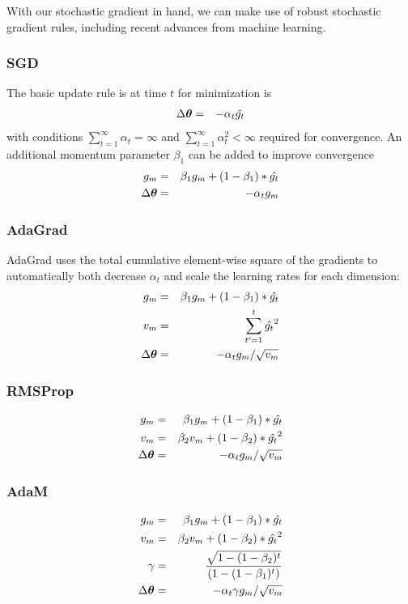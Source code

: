 \documentclass[]{article}
\begin{document}
With our stochastic gradient in hand, we can make use of robust stochastic gradient rules, including recent advances from machine learning.

\subsubsection{SGD}
The basic update rule is at time $t$ for minimization is
\begin{eqnarray}
  \Delta{\bm \theta} & = & - \alpha_t \hat{g_t}
\end{eqnarray}
with conditions $\sum_{t=1}^{\infty} \alpha_t = \infty$ and $\sum_{t=1}^{\infty} \alpha_t^2 < \infty$ required for convergence.
An additional momentum parameter $\beta_1$ can be added to improve convergence
\begin{eqnarray}
  g_m & = & \beta_1 g_m + (1-\beta_1)*\hat{g_t} \\
  \Delta{\bm \theta} & = & - \alpha_t g_m
\end{eqnarray}

\subsubsection{AdaGrad}
AdaGrad uses the total cumulative element-wise square of the gradients to automatically both decrease $\alpha_t$ and scale the learning rates for each dimension:
\begin{eqnarray}
  g_m    & = & \beta_1 g_m + (1-\beta_1)*\hat{g_t} \\
  v_m & = & \sum_{t'=1}^t \hat{g_t}^2 \\
  \Delta{\bm \theta} & = & - \alpha_t g_m / \sqrt{v_m}
\end{eqnarray}

\subsubsection{RMSProp}
\begin{eqnarray}
  g_m    & = & \beta_1 g_m + (1-\beta_1)*\hat{g_t} \\
  v_m & = & \beta_2 v_m + (1-\beta_2)*\hat{g_t}^2 \\
  \Delta{\bm \theta} & = & - \alpha_t g_m / \sqrt{v_m}
\end{eqnarray}

\subsubsection{AdaM}
\begin{eqnarray}
  g_m    & = & \beta_1 g_m + (1-\beta_1)*\hat{g_t} \\
  v_m & = & \beta_2 v_m + (1-\beta_2)*\hat{g_t}^2 \\
  \gamma & = & \frac{ \sqrt{1-(1-\beta_2)^t}}{(1-(1-\beta_1)^t)} \\
  \Delta{\bm \theta} & = & - \alpha_t \gamma g_m / \sqrt{v_m}
\end{eqnarray}
\end{document}
